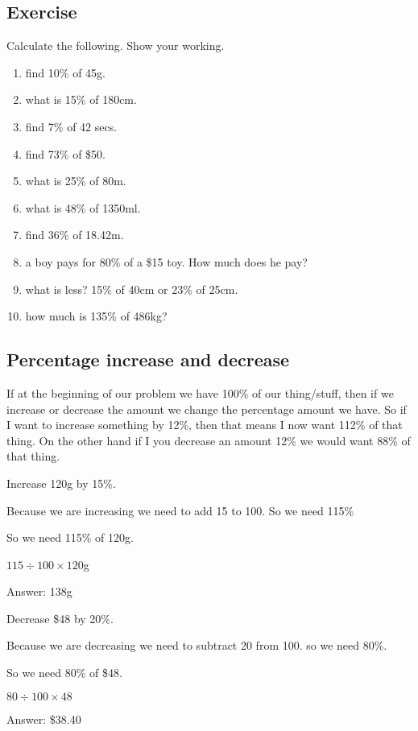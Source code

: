 \subsection{Exercise}
Calculate the following.  Show your working.
\begin{enumerate}
	\item find 10\% of 45g.
	\item what is 15\% of 180cm.
	\item find 7\% of 42 secs.
	\item find 73\% of \$50.
	\item what is 25\% of 80m.
	\item what is 48\% of 1350ml.
	\item find 36\% of 18.42m.
	\item a boy pays for 80\% of a \$15 toy.  How much does he pay?
	\item what is less? 15\% of 40cm or 23\% of 25cm.
	\item how much is 135\% of 486kg?
\end{enumerate}
\subsection{Percentage increase and decrease}
If at the beginning of our problem we have 100\% of our thing/stuff, then if we increase or decrease the amount we change the percentage amount we have.
So if I want to increase something by 12\%, then that means I now want 112\% of that thing.  On the other hand if I you decrease an amount 12\% we would want 88\% of that thing.

\begin{exmp}
Increase 120g by 15\%.

Because we are increasing we need to add 15 to 100.  So we need 115\%

So we need 115\% of 120g.

$115 \div 100 \times 120$g

Answer: 138g
\end{exmp}

\begin{exmp}
Decrease \$48 by 20\%.

Because we are decreasing we need to subtract 20 from 100.  so we need 80\%.

So we need 80\% of \$48.

$80 \div 100 \times 48$

Answer: \$38.40
\end{exmp}

